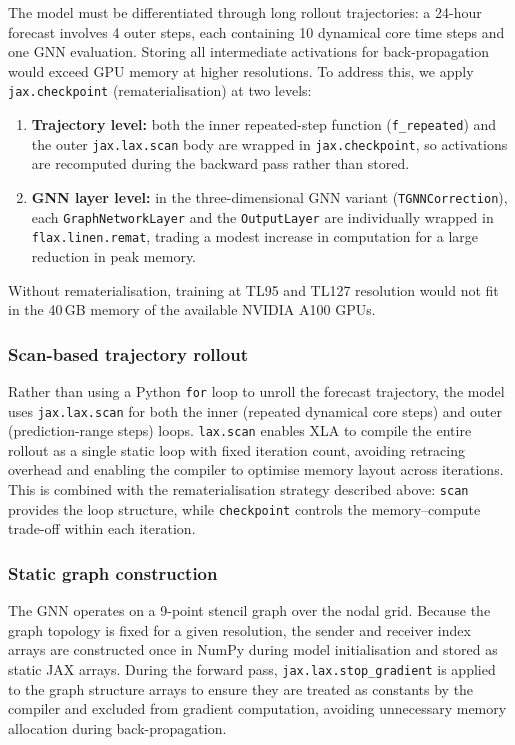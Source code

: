 The model must be differentiated through long rollout trajectories: a 24-hour forecast involves 4 outer steps, each containing 10 dynamical core time steps and one GNN evaluation.
Storing all intermediate activations for back-propagation would exceed GPU memory at higher resolutions.
To address this, we apply \texttt{jax.checkpoint} (rematerialisation) at two levels:
\begin{enumerate}
    \item \textbf{Trajectory level:} both the inner repeated-step function (\texttt{f\_repeated}) and the outer \texttt{jax.lax.scan} body are wrapped in \texttt{jax.checkpoint}, so activations are recomputed during the backward pass rather than stored.
    \item \textbf{GNN layer level:} in the three-dimensional GNN variant (\texttt{TGNNCorrection}), each \texttt{GraphNetworkLayer} and the \texttt{OutputLayer} are individually wrapped in \texttt{flax.linen.remat}, trading a modest increase in computation for a large reduction in peak memory.
\end{enumerate}
Without rematerialisation, training at TL95 and TL127 resolution would not fit in the 40\,GB memory of the available NVIDIA A100 GPUs.

\subsubsection{Scan-based trajectory rollout}

Rather than using a Python \texttt{for} loop to unroll the forecast trajectory, the model uses \texttt{jax.lax.scan} for both the inner (repeated dynamical core steps) and outer (prediction-range steps) loops.
\texttt{lax.scan} enables XLA to compile the entire rollout as a single static loop with fixed iteration count, avoiding retracing overhead and enabling the compiler to optimise memory layout across iterations.
This is combined with the rematerialisation strategy described above: \texttt{scan} provides the loop structure, while \texttt{checkpoint} controls the memory--compute trade-off within each iteration.

\subsubsection{Static graph construction}

The GNN operates on a 9-point stencil graph over the nodal grid.
Because the graph topology is fixed for a given resolution, the sender and receiver index arrays are constructed once in NumPy during model initialisation and stored as static JAX arrays.
During the forward pass, \texttt{jax.lax.stop\_gradient} is applied to the graph structure arrays to ensure they are treated as constants by the compiler and excluded from gradient computation, avoiding unnecessary memory allocation during back-propagation.

